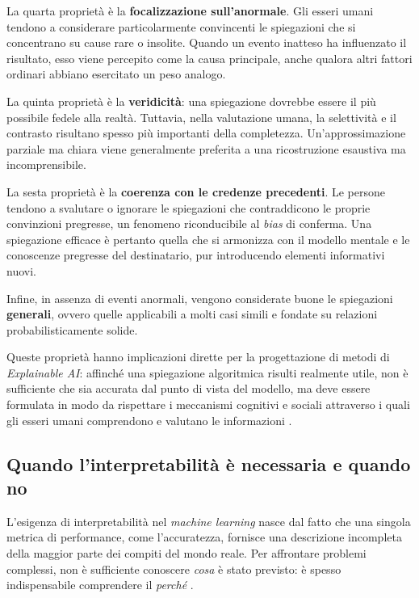 La quarta proprietà è la \textbf{focalizzazione sull'anormale}. Gli esseri umani tendono a considerare particolarmente convincenti le spiegazioni che si concentrano su cause rare o insolite. Quando un evento inatteso ha influenzato il risultato, esso viene percepito come la causa principale, anche qualora altri fattori ordinari abbiano esercitato un peso analogo.

La quinta proprietà è la \textbf{veridicità}: una spiegazione dovrebbe essere il più possibile fedele alla realtà. Tuttavia, nella valutazione umana, la selettività e il contrasto risultano spesso più importanti della completezza. Un'approssimazione parziale ma chiara viene generalmente preferita a una ricostruzione esaustiva ma incomprensibile.

La sesta proprietà è la \textbf{coerenza con le credenze precedenti}. Le persone tendono a svalutare o ignorare le spiegazioni che contraddicono le proprie convinzioni pregresse, un fenomeno riconducibile al \textit{bias} di conferma. Una spiegazione efficace è pertanto quella che si armonizza con il modello mentale e le conoscenze pregresse del destinatario, pur introducendo elementi informativi nuovi.

Infine, in assenza di eventi anormali, vengono considerate buone le spiegazioni \textbf{generali}, ovvero quelle applicabili a molti casi simili e fondate su relazioni probabilisticamente solide.

Queste proprietà hanno implicazioni dirette per la progettazione di metodi di \textit{Explainable AI}: affinché una spiegazione algoritmica risulti realmente utile, non è sufficiente che sia accurata dal punto di vista del modello, ma deve essere formulata in modo da rispettare i meccanismi cognitivi e sociali attraverso i quali gli esseri umani comprendono e valutano le informazioni \cite{molnar2025interpretable}.

\subsection{Quando l'interpretabilità è necessaria e quando no}

L'esigenza di interpretabilità nel \textit{machine learning} nasce dal fatto che una singola metrica di performance, come l'accuratezza, fornisce una descrizione incompleta della maggior parte dei compiti del mondo reale. Per affrontare problemi complessi, non è sufficiente conoscere \textit{cosa} è stato previsto: è spesso indispensabile comprendere il \textit{perché} \cite{molnar2025interpretable}.


